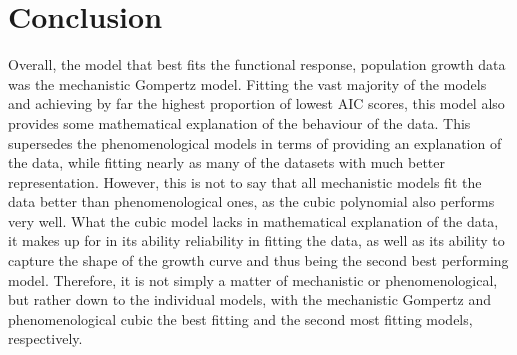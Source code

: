 \documentclass[11pt, a4paper]{article} %
\begin{document}
\section{Conclusion}

Overall, the model that best fits the functional response, population growth data was the mechanistic Gompertz model. Fitting the vast majority of the models and achieving by far the highest proportion of lowest AIC scores, this model also provides some mathematical explanation of the behaviour of the data. This supersedes the phenomenological models in terms of providing an explanation of the data, while fitting nearly as many of the datasets with much better representation. However, this is not to say that all mechanistic models fit the data better than phenomenological ones, as the cubic polynomial also performs very well. What the cubic model lacks in mathematical explanation of the data, it makes up for in its ability reliability in fitting the data, as well as its ability to capture the shape of the growth curve and thus being the second best performing model. Therefore, it is not simply a matter of mechanistic or phenomenological, but rather down to the individual models, with the mechanistic Gompertz and phenomenological cubic the best fitting and the second most fitting models, respectively.


\end{document}

